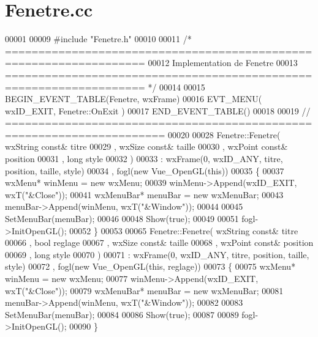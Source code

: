 \section{Fenetre.\+cc}
\label{_fenetre_8cc_source}

\begin{DoxyCode}
00001 
00009 \textcolor{preprocessor}{#include "Fenetre.h"}
00010 
00011 \textcolor{comment}{/* ===================================================================}
00012 \textcolor{comment}{   Implementation de Fenetre}
00013 \textcolor{comment}{   =================================================================== */}
00014 
00015 BEGIN\_EVENT\_TABLE(Fenetre, wxFrame)
00016     EVT\_MENU( wxID\_EXIT, Fenetre::OnExit )
00017 END\_EVENT\_TABLE()
00018 
00019 \textcolor{comment}{// ======================================================================}
00020 
00028 Fenetre::Fenetre( wxString const& titre
00029                 , wxSize   const& taille
00030                 , wxPoint  const& position
00031                 , \textcolor{keywordtype}{long}            style
00032                 )
00033 : wxFrame(0, wxID\_ANY, titre, position, taille, style)
00034 , fogl(new Vue_OpenGL(this))
00035 \{
00037   wxMenu* winMenu = \textcolor{keyword}{new} wxMenu;
00039   winMenu->Append(wxID\_EXIT, wxT(\textcolor{stringliteral}{"&Close"}));
00041   wxMenuBar* menuBar = \textcolor{keyword}{new} wxMenuBar;
00043   menuBar->Append(winMenu, wxT(\textcolor{stringliteral}{"&Window"}));
00044 
00045   SetMenuBar(menuBar);
00046 
00048   Show(\textcolor{keyword}{true});
00049 
00051   fogl->InitOpenGL();
00052 \}
00053 
00065 Fenetre::Fenetre( wxString \textcolor{keyword}{const}& titre 
00066                 , \textcolor{keywordtype}{bool} reglage
00067                 , wxSize   \textcolor{keyword}{const}& taille
00068                 , wxPoint  \textcolor{keyword}{const}& position
00069                 , \textcolor{keywordtype}{long}            style
00070                 )
00071 : wxFrame(0, wxID\_ANY, titre, position, taille, style)
00072 , fogl(new Vue_OpenGL(this, reglage))
00073 \{
00075   wxMenu* winMenu = \textcolor{keyword}{new} wxMenu;
00077   winMenu->Append(wxID\_EXIT, wxT(\textcolor{stringliteral}{"&Close"}));
00079   wxMenuBar* menuBar = \textcolor{keyword}{new} wxMenuBar;
00081   menuBar->Append(winMenu, wxT(\textcolor{stringliteral}{"&Window"}));
00082 
00083   SetMenuBar(menuBar);
00084 
00086   Show(\textcolor{keyword}{true});
00087 
00089   fogl->InitOpenGL();
00090 \}
\end{DoxyCode}
